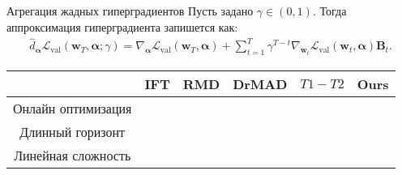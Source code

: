 \documentclass[aspectratio=169]{beamer}
\newcommand{\vect}[1]{\boldsymbol{\mathbf{#1}}}
\begin{document}
\begin{frame}{Агрегация жадных гиперградиентов}
  Пусть задано $\gamma \in (0, 1)$. Тогда аппроксимация гиперградиента запишется как:
  \begin{align*}
    \hat{d}_{\vect{\alpha}}\mathcal{L}_\text{val}(\vect{w}_T, \vect{\alpha}; \gamma) = \nabla_{\vect{\alpha}}\mathcal{L}_\text{val}(\vect{w}_T, \vect{\alpha}) + \sum_{t=1}^T\gamma^{T-t}\nabla_{\vect{w}_t}\mathcal{L}_\text{val}(\vect{w}_t, \vect{\alpha})\vect{B}_t.
  \end{align*}
  \begin{table}
    \begin{tabular}{c|c|c|c|c|c} \toprule
       & IFT & RMD & DrMAD & $T1-T2$ & Ours \\ \midrule
      Онлайн оптимизация & \color{dark_red}{\texttimes} & \color{dark_green}{\checkmark} & \color{dark_red}{\texttimes} & \color{dark_green}{\checkmark} & \color{dark_green}{\checkmark} \\
      Длинный горизонт & \color{dark_green}{\checkmark} & \color{dark_green}{\checkmark} & \color{dark_green}{\checkmark} & \color{dark_red}{\texttimes} & \color{dark_green}{\checkmark} \\
      Линейная сложность & \color{dark_green}{\checkmark} & \color{dark_red}{\texttimes} & \color{dark_green}{\checkmark} & \color{dark_green}{\checkmark} & \color{dark_green}{\checkmark} \\ \bottomrule
      
    \end{tabular}
  \end{table}
  
\end{frame}

\end{document}
